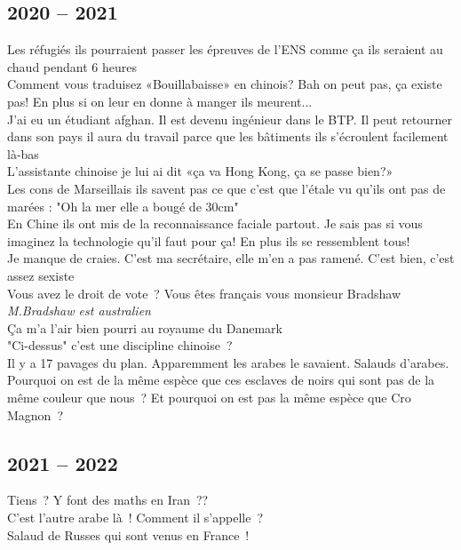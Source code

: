 \documentclass[french, a4paper, openany]{book}
\begin{document}
	\subsection*{2020 -- 2021}
		\noindent \og Les réfugiés ils pourraient passer les épreuves de l'ENS comme ça ils seraient au chaud pendant 6 heures \fg \\
		\og Comment vous traduisez «Bouillabaisse» en chinois? Bah on peut pas, ça existe pas! En plus si on leur en donne à manger ils meurent... \fg \\
		\og J'ai eu un étudiant afghan. Il est devenu ingénieur dans le BTP. Il peut retourner dans son pays il aura du travail parce que les bâtiments ils s'écroulent facilement là-bas \fg \\
		\og L'assistante chinoise je lui ai dit «ça va Hong Kong, ça se passe bien?» \fg \\
		\og Les cons de Marseillais ils savent pas ce que c'est que l'étale vu qu'ils ont pas de marées : "Oh la mer elle a bougé de 30cm" \fg \\
		\og En Chine ils ont mis de la reconnaissance faciale partout. Je sais pas si vous imaginez la technologie qu'il faut pour ça! En plus ils se ressemblent tous! \fg \\
		\og Je manque de craies. C'est ma secrétaire, elle m'en a pas ramené. C'est bien, c'est assez sexiste \fg \\
		\og Vous avez le droit de vote~? Vous êtes français vous monsieur Bradshaw \fg \emph{M.Bradshaw est australien} \\
		\og Ça m'a l'air bien pourri au royaume du Danemark \fg \\
		\og "Ci-dessus" c'est une discipline chinoise~? \fg \\
		\og Il y a 17 pavages du plan. Apparemment les arabes le savaient. Salauds d'arabes. \fg \\
		\og Pourquoi on est de la même espèce que ces esclaves de noirs qui sont pas de la même couleur que nous~? Et pourquoi on est pas la même espèce que Cro Magnon~? \fg \\

	\subsection*{2021 -- 2022}
		\noindent \og Tiens~? Y font des maths en Iran~?? \fg \\
		\og C'est l'autre arabe là~! Comment il s'appelle~? \fg \\
		\og Salaud de Russes qui sont venus en France~! \fg \\
\end{document}
